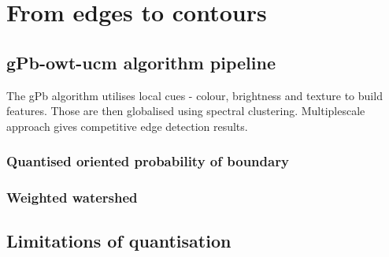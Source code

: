 \chapter{From edges to contours} %
\label{Chapter2}
\section{gPb-owt-ucm algorithm pipeline}
The gPb algorithm utilises local cues - colour, brightness and texture to build features. Those are then globalised using spectral clustering. Multiplescale approach gives competitive edge detection results.

\subsection{Quantised oriented probability of boundary}
\subsection{Weighted watershed}
\section{Limitations of quantisation} %
